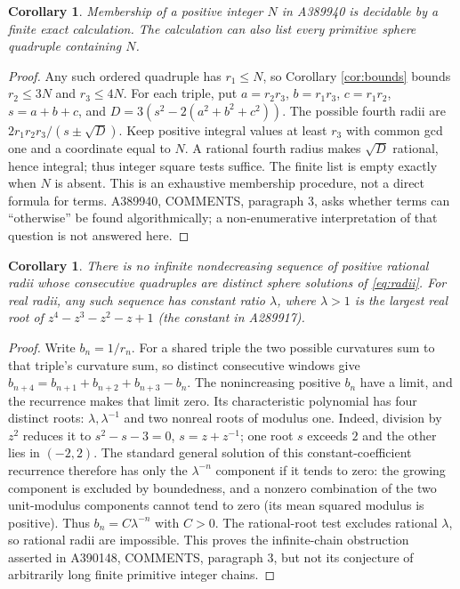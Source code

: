 \documentclass[11pt]{article}
\newtheorem{corollary}[theorem]{Corollary}
\begin{document}
\begin{corollary}\label{cor:membership}
Membership of a positive integer $N$ in A389940 is decidable by a finite
exact calculation. The calculation can also list every primitive sphere
quadruple containing $N$.
\end{corollary}
\begin{proof}
Any such ordered quadruple has $r_1\le N$, so Corollary
\ref{cor:bounds} bounds $r_2\le3N$ and $r_3\le4N$.
For each triple, put $a=r_2r_3$, $b=r_1r_3$, $c=r_1r_2$,
$s=a+b+c$, and $D=3(s^2-2(a^2+b^2+c^2))$.
The possible fourth radii are $2r_1r_2r_3/(s\pm\sqrt D)$.
Keep positive integral values at least $r_3$ with common gcd one and a
coordinate equal to $N$. A rational fourth radius makes $\sqrt D$
rational, hence integral; thus integer square tests suffice.
The finite list is empty exactly when $N$ is absent. This is an exhaustive
membership procedure, not a direct formula for terms. A389940, COMMENTS,
paragraph 3, asks whether terms can ``otherwise'' be found algorithmically;
a non-enumerative interpretation of that question is not answered here.
\end{proof}

\begin{corollary}\label{cor:chain}
There is no infinite nondecreasing sequence of positive rational radii
whose consecutive quadruples are distinct sphere solutions of
\eqref{eq:radii}. For real radii, any such sequence has constant ratio
$\lambda$, where $\lambda>1$ is the largest real root of
$z^4-z^3-z^2-z+1$ (the constant in A289917).
\end{corollary}
\begin{proof}
Write $b_n=1/r_n$. For a shared triple the two possible curvatures
sum to that triple's curvature sum, so distinct consecutive windows give
$b_{n+4}=b_{n+1}+b_{n+2}+b_{n+3}-b_n$.
The nonincreasing positive $b_n$ have a limit, and the recurrence makes
that limit zero. Its characteristic polynomial has four distinct roots:
$\lambda,\lambda^{-1}$ and two nonreal roots of modulus one. Indeed,
division by $z^2$ reduces it to $s^2-s-3=0$, $s=z+z^{-1}$;
one root $s$ exceeds $2$ and the other lies in $(-2,2)$.
The standard general solution of this constant-coefficient recurrence
therefore has only the $\lambda^{-n}$ component if it tends to zero:
the growing component is excluded by boundedness, and a nonzero
combination of the two unit-modulus components cannot tend to zero
(its mean squared modulus is positive).
Thus $b_n=C\lambda^{-n}$ with $C>0$.
The rational-root test excludes rational $\lambda$, so rational
radii are impossible. This proves the infinite-chain obstruction
asserted in A390148, COMMENTS, paragraph 3, but not its conjecture
of arbitrarily long finite primitive integer chains.
\end{proof}
\end{document}
